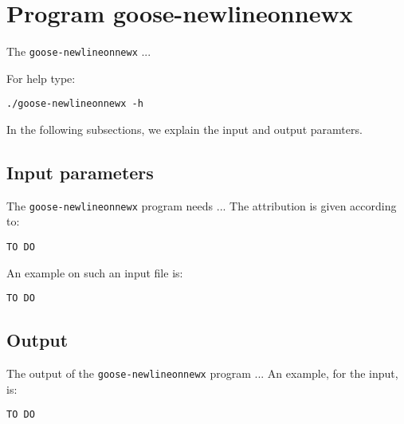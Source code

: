 \section{Program goose-newlineonnewx}
The \texttt{goose-newlineonnewx} ...

For help type:
\begin{lstlisting}
./goose-newlineonnewx -h
\end{lstlisting}
In the following subsections, we explain the input and output paramters.

\subsection{Input parameters}

The \texttt{goose-newlineonnewx} program needs ...
The attribution is given according to:
\begin{lstlisting}
TO DO
\end{lstlisting}

An example on such an input file is:
\begin{lstlisting}
TO DO
\end{lstlisting}

\subsection{Output}
The output of the \texttt{goose-newlineonnewx} program ...
An example, for the input, is:
\begin{lstlisting}
TO DO
\end{lstlisting}

